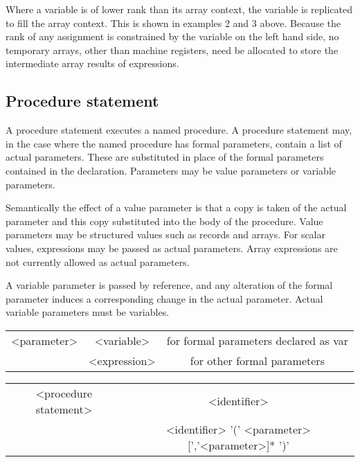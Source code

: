 {Where a variable is of lower rank than its array context, the variable is replicated
to fill the array context. This is shown in examples 2
and 3 above. Because the rank of any assignment is constrained by the variable
on the left hand side, no temporary arrays, other than machine registers, need
be allocated to store the intermediate array results of expressions.


\subsection{Procedure statement}

A procedure statement executes a named procedure. A procedure
statement may, in the case where the named procedure has formal parameters,
contain a list of actual parameters. These are substituted in place of the formal
parameters contained in the declaration. Parameters may be value parameters
or variable parameters. 

Semantically the effect of a value parameter is that a copy is taken of the
actual parameter and this copy substituted into the body of
the procedure. Value parameters may be structured values such as records and
arrays. For scalar values, expressions may be passed as actual parameters. Array
expressions are not currently allowed as actual parameters. 

A variable parameter is passed by reference, and any alteration of the formal
parameter induces a corresponding change in the actual parameter. Actual variable
parameters must be variables.

\vspace{0.3cm}
{\centering \begin{tabular}{|c|c||c|}
\hline 
<parameter>&
<variable>&
for formal parameters declared as var\\
&
<expression>&
for other formal parameters \\
\hline 
\end{tabular}\par}
\vspace{0.3cm}

\vspace{0.3cm}
{\centering \begin{tabular}{|c|c|}
\hline 
<procedure statement>&
<identifier>\\
&
<identifier> '(' <parameter> {[}','<parameter>{]}{*} ')'\\
\hline 
\end{tabular}\par}
\vspace{0.3cm}


}
